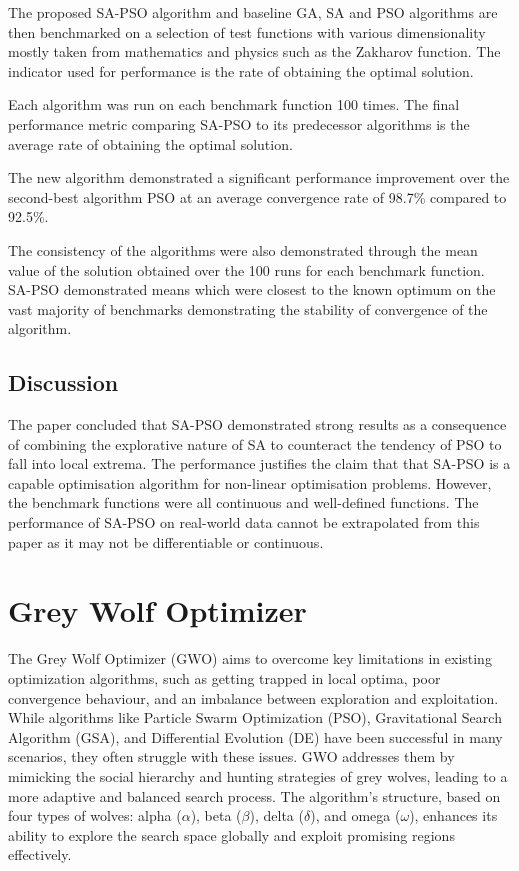 \documentclass[a4paper, 12pt]{extarticle}
\begin{document}
The proposed SA-PSO algorithm and baseline GA, SA and PSO algorithms are then benchmarked on a selection of test functions with various dimensionality mostly taken from mathematics and physics such as the Zakharov function. The indicator used for performance is the rate of obtaining the optimal solution.

Each algorithm was run on each benchmark function 100 times. The final performance metric comparing SA-PSO to its predecessor algorithms is the average rate of obtaining the optimal solution.

The new algorithm demonstrated a significant performance improvement over the second-best algorithm PSO at an average convergence rate of 98.7\% compared to 92.5\%.

The consistency of the algorithms were also demonstrated through the mean value of the solution obtained over the 100 runs for each benchmark function. SA-PSO demonstrated means which were closest to the known optimum on the vast majority of benchmarks demonstrating the stability of convergence of the algorithm.

\subsection{Discussion}

The paper concluded that SA-PSO demonstrated strong results as a consequence of combining the explorative nature of SA to counteract the tendency of PSO to fall into local extrema. The performance justifies the claim that that SA-PSO is a capable optimisation algorithm for non-linear optimisation problems. 
However, the benchmark functions were all continuous and well-defined functions. The performance of SA-PSO on real-world data cannot be extrapolated from this paper as it may not be differentiable or continuous.

\newpage
\section{Grey Wolf Optimizer}
The Grey Wolf Optimizer (GWO) aims to overcome key limitations in existing optimization algorithms, such as getting trapped in local optima, poor convergence behaviour, and an imbalance between exploration and exploitation. While algorithms like Particle Swarm Optimization (PSO), Gravitational Search Algorithm (GSA), and Differential Evolution (DE) have been successful in many scenarios, they often struggle with these issues. GWO addresses them by mimicking the social hierarchy and hunting strategies of grey wolves, leading to a more adaptive and balanced search process. The algorithm's structure, based on four types of wolves: alpha ($\alpha$), beta ($\beta$), delta ($\delta$), and omega ($\omega$), enhances its ability to explore the search space globally and exploit promising regions effectively\cite{mirjalili2014grey}.
\end{document}
